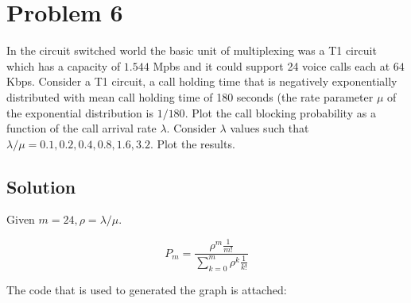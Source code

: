 
\section*{Problem 6}

In the circuit switched world the basic unit of multiplexing was a T1 circuit which has a capacity of $1.544$
Mpbs and it could support 24 voice calls each at $64$ Kbps.
Consider a T1 circuit, a call holding time that is negatively exponentially distributed with mean call holding time of 180 seconds (the rate parameter $\mu$ of the exponential distribution is $1/180$.
Plot the call blocking probability as a function of the call arrival rate $\lambda$.
Consider $\lambda$ values such that $\lambda/\mu = 0.1, 0.2, 0.4, 0.8, 1.6, 3.2$.
Plot the results.

\subsection*{Solution}

Given $m = 24, \rho = \lambda / \mu$.

$$P_m = \frac{\rho^m \frac{1}{m!}}{\sum_{k=0}^m \rho^k \frac{1}{k!}}$$

\begin{figure}[h]
    \centering
\end{figure}

The code that is used to generated the graph is attached:

\begin{minipage}{\linewidth}
    
\end{minipage}